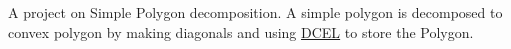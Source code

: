 A project on Simple Polygon decomposition. A simple polygon is decomposed to convex polygon by making diagonals and using \mbox{\hyperlink{classDCEL}{DCEL}} to store the Polygon. 